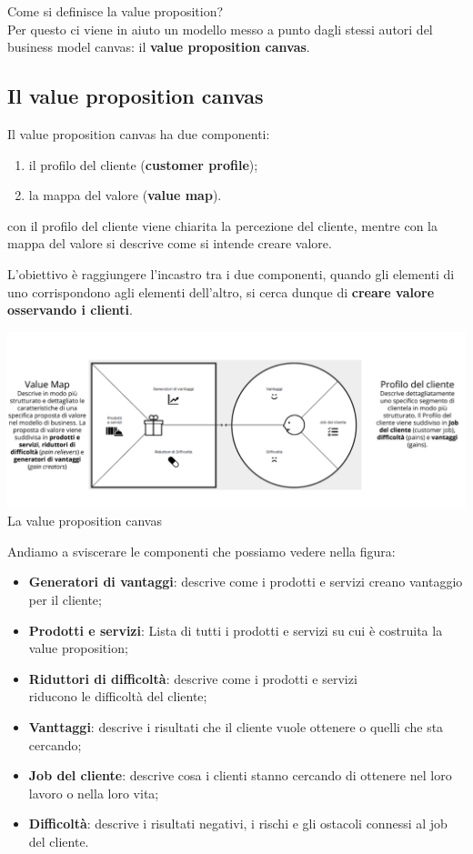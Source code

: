 \documentclass[14pt]{extarticle}
\begin{document}
Come si definisce la value proposition? \\Per questo ci viene in aiuto un
modello messo a punto dagli stessi autori del business model canvas: il
\textbf{value proposition canvas}.

\subsection{Il value proposition canvas}

Il value proposition canvas ha due componenti:

\begin{enumerate}
    \item il profilo del cliente (\textbf{customer profile});
    \item la mappa del valore (\textbf{value map}). 
\end{enumerate}
con il profilo del cliente viene chiarita la percezione del cliente, mentre con
la mappa del valore si descrive come si intende creare valore.

L'obiettivo è raggiungere l'incastro tra i due componenti, quando gli elementi
di uno corrispondono agli elementi dell'altro, si cerca dunque di \textbf{creare
valore osservando i clienti}.

\begin{center}
    \includegraphics[scale=0.50]{images/valuecanvas.png}
    La value proposition canvas
\end{center}
Andiamo a sviscerare le componenti che possiamo vedere nella figura:

\begin{itemize}
    \item \textbf{Generatori di vantaggi}: descrive come i prodotti e servizi
    creano vantaggio per il cliente;
    \item \textbf{Prodotti e servizi}: Lista di tutti i prodotti e servizi su
    cui è costruita la value proposition;
    \item \textbf{Riduttori di difficoltà}: descrive come i prodotti e servizi
    \\
    riducono le difficoltà del cliente;
    \item \textbf{Vanttaggi}: descrive i risultati che il cliente vuole ottenere
    o quelli che sta cercando;
    \item \textbf{Job del cliente}: descrive cosa i clienti stanno cercando di
    ottenere nel loro lavoro o nella loro vita;
    \item \textbf{Difficoltà}: descrive i risultati negativi, i rischi e gli
    ostacoli connessi al job del cliente.
\end{itemize}
\end{document}
